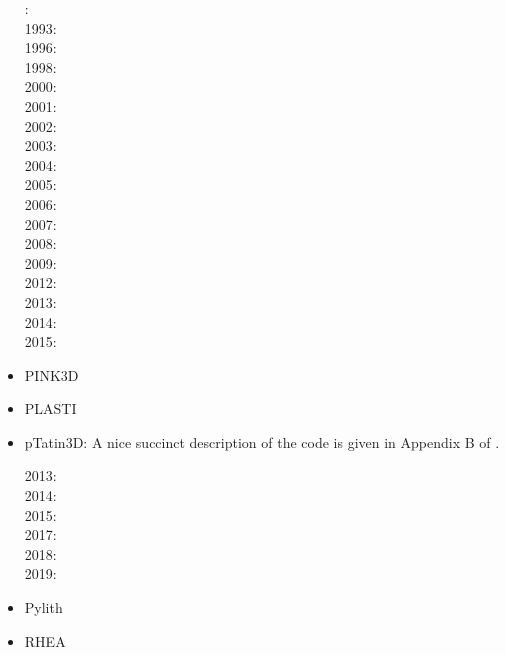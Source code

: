 \begin{itemize}
: \cite{cund89}\\
1993: \cite{poli93}\\
1996: \cite{hach96}\\
1998: \cite{gepd98}\\
2000: \cite{labp00}\\
2001: \cite{bujl01}\cite{bupo01}\\
2002: \cite{bast02}\cite{clbb02}\\
2003: \cite{hags03}\cite{gehd03}\cite{upke03}\\
2004: \cite{guhl04}\cite{gewi04}\cite{toba04}\cite{tibb04}\\
2005: \cite{bugu05}\\
2006: \cite{buwa06}\\
2007: \cite{yaab07}\cite{buto07}\\
2008: \cite{yaba08}\cite{tibb08}\\
2009: \cite{gecm09}\cite{yahb09}\cite{bucl09}\\
2012: \cite{anwb12}\cite{gech12}\cite{gubc12}\cite{gerb12}\\
2013: \cite{wabd13}\cite{frbm13}\\
2014: \cite{frba14}\cite{gagb14}\cite{bufa14}\\
2015: \cite{wulc15}\cite{marl15}\cite{gebw15}\cite{svlh15}\\




\item PINK3D
\cite{vosc15}


\item PLASTI
\cite{fuwb06}



\item pTatin3D: A nice succinct description of the code is given in Appendix B of \cite{lemh17}.

2013: \cite{phil13}\\
2014: \cite{mabl14}\\
2015: \cite{mabl15}\\
2017: \cite{lemh17}\\
2018: \cite{jolp18}\\
2019: \cite{jolm19}

\item Pylith

\cite{aakw13}


\item RHEA
\cite{bugg08}
\cite{stgb10}
\cite{algs12}
\cite{busa13}


\end{itemize}
